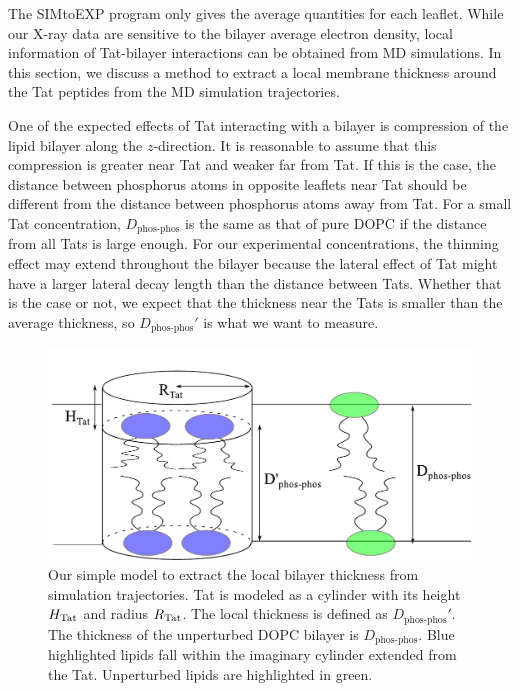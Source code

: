 The SIMtoEXP program only gives the average quantities for each leaflet. 
While our X-ray data are sensitive to the bilayer average electron density,
local information of Tat-bilayer interactions can be obtained from MD simulations.
In this section, we discuss a method to extract a local membrane thickness
around the Tat peptides from the MD simulation trajectories. 

One of the expected effects of Tat interacting with a bilayer is 
compression of the lipid bilayer along the $z$-direction. It is 
reasonable to assume that this compression is greater near Tat and
weaker far from Tat.
If this is the case, the distance between phosphorus atoms in opposite
leaflets near Tat should be different from the distance between
phosphorus atoms away from Tat.  
For a small Tat concentration, $D_\textrm{phos-phos}$ is the same as that of 
pure DOPC if the distance from all Tats is large enough.  
For our experimental concentrations, the thinning effect may extend throughout 
the bilayer because the lateral effect of Tat might have a larger lateral decay 
length than the distance between Tats. Whether that is the case or not, we 
expect that the thickness near the Tats is smaller than the average thickness,
so $D_\textrm{phos-phos}'$ is what we want to measure. 

\begin{figure}[htbp]
  \centering
  \includegraphics[scale=0.7]{./figures/Tat/cylinder_model}
  \caption{Our simple model to extract the local bilayer thickness from 
  simulation trajectories. Tat is modeled as a cylinder with its height $H_\textrm{Tat}$ 
  and radius $R_\textrm{Tat}$. The local thickness is defined as $D_\textrm{phos-phos}'$. 
  The thickness of the unperturbed DOPC bilayer is $D_\textrm{phos-phos}$. 
  Blue highlighted lipids fall within the imaginary cylinder extended from
  the Tat. Unperturbed lipids are highlighted in green.}
  \label{fig:cylinder_model}
\end{figure}
 
